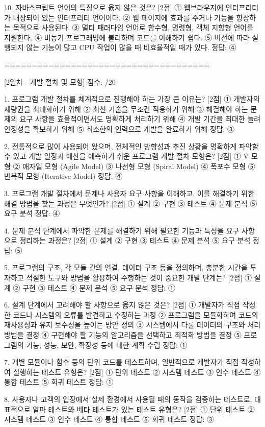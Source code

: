 10. 자바스크립트 언어의 특징으로 옳지 않은 것은? [2점]
① 웹브라우저에 인터프리터가 내장되어 있는 인터프리터 언어이다.
② 웹 페이지에 효과를 주거나 기능을 향상하는 목적으로 사용된다.
③ 멀티 패러다임 언어로 함수형, 명령형, 객체 지향형 언어를 지원한다.
④ 비동기 프로그래밍에 불리하며 코드를 이해하기 쉽다.
⑤ 버전에 따라 실행되지 않는 기능이 많고 CPU 작업이 많을 때 비효율적일 때가 있다.
정답: ④

=====================================

[2일차 - 개발 절차 및 모형]
점수: /20

1. 프로그램 개발 절차를 체계적으로 진행해야 하는 가장 큰 이유는? [2점]
① 개발자의 재량권을 최대화하기 위해
② 최신 기술을 무조건 적용하기 위해
③ 해결해야 하는 문제의 요구 사항을 효율적이면서도 명확하게 처리하기 위해
④ 개발 기간을 최대한 늘려 안정성을 확보하기 위해
⑤ 최소한의 인력으로 개발을 완료하기 위해
정답: ③

2. 전통적으로 많이 사용되어 왔으며, 전체적인 방향성과 추진 상황을 명확하게 파악할 수 있고 개발 일정과 예산을 예측하기 쉬운 프로그램 개발 절차 모형은? [2점]
① V 모형
② 애자일 모형 (Agile Model)
③ 나선형 모형 (Spiral Model)
④ 폭포수 모형
⑤ 반복적 모형 (Iterative Model)
정답: ④

3. 프로그램 개발 절차에서 문제나 사용자 요구 사항을 이해하고, 이를 해결하기 위한 해결 방법을 찾는 과정은 무엇인가? [2점]
① 설계
② 구현
③ 테스트
④ 문제 분석
⑤ 요구 분석
정답: ④

4. 문제 분석 단계에서 파악한 문제를 해결하기 위해 필요한 기능과 특성을 요구 사항으로 정리하는 과정은? [2점]
① 설계
② 구현
③ 테스트
④ 문제 분석
⑤ 요구 분석
정답: ⑤

5. 프로그램의 구조, 각 모듈 간의 연결, 데이터 구조 등을 정의하며, 충분한 시간을 투자하고 적절한 도구와 방법을 활용하여 수행하는 것이 중요한 개발 단계는? [2점]
① 설계
② 구현
③ 테스트
④ 문제 분석
⑤ 요구 분석
정답: ①

6. 설계 단계에서 고려해야 할 사항으로 옳지 않은 것은? [2점]
① 개발자가 직접 작성한 코드나 시스템의 오류를 발견하고 수정하는 과정
② 프로그램을 모듈화하여 코드의 재사용성과 유지 보수성을 높이는 방안 정의
③ 시스템에서 다룰 데이터의 구조와 처리 방법을 결정
④ 구현해야 할 기능의 알고리즘을 선택하고 최적화 방법을 결정
⑤ 프로그램의 기능, 성능, 보안, 확장성 등에 대한 계획 수립
정답: ①

7. 개별 모듈이나 함수 등의 단위 코드를 테스트하며, 일반적으로 개발자가 직접 작성하여 실행하는 테스트 유형은? [2점]
① 단위 테스트
② 시스템 테스트
③ 인수 테스트
④ 통합 테스트
⑤ 회귀 테스트
정답: ①

8. 사용자나 고객의 입장에서 실제 환경에서 사용될 때의 동작을 검증하는 테스트로, 대표적으로 알파 테스트와 베타 테스트가 있는 테스트 유형은? [2점]
① 단위 테스트
② 시스템 테스트
③ 인수 테스트
④ 통합 테스트
⑤ 회귀 테스트
정답: ③

